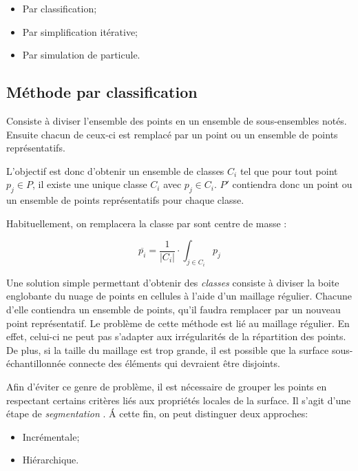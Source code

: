 \begin{itemize}
  \item Par classification;
  \item Par simplification itérative;
  \item Par simulation de particule.
\end{itemize}

\subsection{Méthode par classification}
\begin{definition}
  Consiste à diviser l'ensemble des points en un ensemble de sous-ensembles notés. Ensuite chacun de ceux-ci est remplacé par un point ou un ensemble de points représentatifs.
\end{definition}

L'objectif est donc d'obtenir un ensemble de classes ${C_i}$ tel que pour tout point $p_j\in P$, il existe une unique classe $C_i$ avec $p_j\in C_i$. $P'$ contiendra donc un point ou un ensemble de points représentatifs pour chaque classe.

Habituellement, on remplacera la classe par sont centre de masse :

$$\overline{p_i}=\frac{1}{|C_i|}\cdot\int_{j\in C_i}p_j$$

Une solution simple permettant d'obtenir des \emph{classes} consiste à diviser la boite englobante du nuage de points en cellules à l'aide d'un maillage régulier. Chacune d'elle contiendra un ensemble de points, qu'il faudra remplacer par un nouveau point représentatif.
Le problème de cette méthode est lié au maillage régulier. En effet, celui-ci ne peut pas s'adapter aux irrégularités de la répartition des points. De plus, si la taille du maillage est trop grande, il est possible que la surface sous-échantillonnée connecte des éléments qui devraient être disjoints.

Afin d'éviter ce genre de problème, il est nécessaire de grouper les points en respectant certains critères liés aux propriétés locales de la surface. Il s'agit d'une étape de \emph{segmentation} . \'{A} cette fin, on peut distinguer deux approches:

\begin{itemize}
  \item Incrémentale;
  \item Hiérarchique.
\end{itemize}

